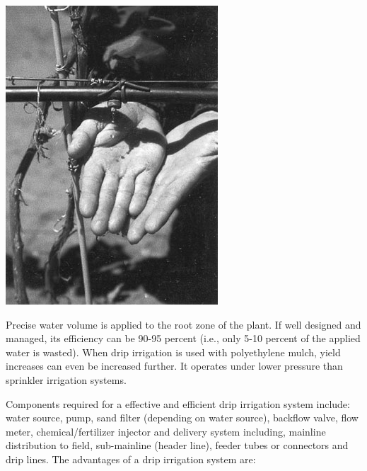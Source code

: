\documentclass[
]{article}
\begin{document}
\includegraphics[width=0.65\linewidth]{../images/irrigation/Drip_irrigation}

Precise water volume is applied to the root zone of the plant. If well designed and managed, its efficiency can be 90-95 percent (i.e., only 5-10 percent of the applied water is wasted). When drip irrigation is used with polyethylene mulch, yield increases can even be increased further. It operates under lower pressure than sprinkler irrigation systems.

Components required for a effective and efficient drip irrigation system include: water source, pump, sand filter (depending on water source), backflow valve, flow meter, chemical/fertilizer injector and delivery system including, mainline distribution to field, sub-mainline (header line), feeder tubes or connectors and drip lines. The advantages of a drip irrigation system are:
\end{document}
